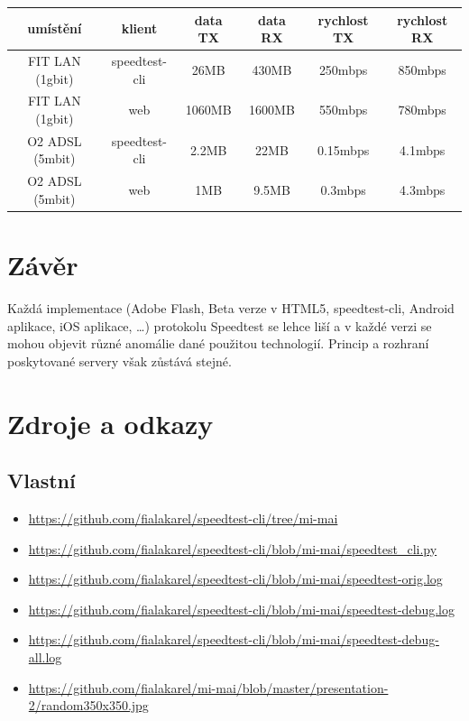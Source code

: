 \documentclass[12pt,a4paper]{article}
\begin{document}
\begin{center}
\begin{tabular}{ | c || c || c | c | c | c |  }
\hline
umístění & klient   &  data TX & data RX & rychlost TX & rychlost RX	\\
\hline
\hline
FIT LAN (1gbit) & speedtest-cli & 26MB   & 430MB  & 250mbps   & 850mbps 	\\ \hline
FIT LAN (1gbit) & web           & 1060MB & 1600MB & 550mbps   & 780mbps 	\\ \hline
O2 ADSL (5mbit) & speedtest-cli & 2.2MB  & 22MB   & 0.15mbps  & 4.1mbps 	\\ \hline
O2 ADSL (5mbit) & web           & 1MB    & 9.5MB  & 0.3mbps   & 4.3mbps 	\\ \hline

\end{tabular}
\end{center}


\section{Závěr}

Každá implementace (Adobe Flash, Beta verze v HTML5, speedtest-cli, Android aplikace, iOS aplikace, \ldots) protokolu Speedtest se lehce liší a v každé verzi se mohou objevit různé anomálie dané použitou technologií. Princip a rozhraní poskytované servery však zůstává stejné.


\section{Zdroje a odkazy}

\subsection{Vlastní}

\begin{itemize}
\item \href{https://github.com/fialakarel/speedtest-cli/tree/mi-mai}
	    {https://github.com/fialakarel/speedtest-cli/tree/mi-mai}
\item \href{https://github.com/fialakarel/speedtest-cli/blob/mi-mai/speedtest\_cli.py}
	    {https://github.com/fialakarel/speedtest-cli/blob/mi-mai/speedtest\_cli.py}
\item \href{https://github.com/fialakarel/speedtest-cli/blob/mi-mai/speedtest-orig.log}
	    {https://github.com/fialakarel/speedtest-cli/blob/mi-mai/speedtest-orig.log}
\item \href{https://github.com/fialakarel/speedtest-cli/blob/mi-mai/speedtest-debug.log}
	    {https://github.com/fialakarel/speedtest-cli/blob/mi-mai/speedtest-debug.log}
\item \href{https://github.com/fialakarel/speedtest-cli/blob/mi-mai/speedtest-debug-all.log}
	    {https://github.com/fialakarel/speedtest-cli/blob/mi-mai/speedtest-debug-all.log}
\item \href{https://github.com/fialakarel/mi-mai/blob/master/presentation-2/random350x350.jpg}
	    {https://github.com/fialakarel/mi-mai/blob/master/presentation-2/random350x350.jpg}
\end{itemize}
\end{document}
